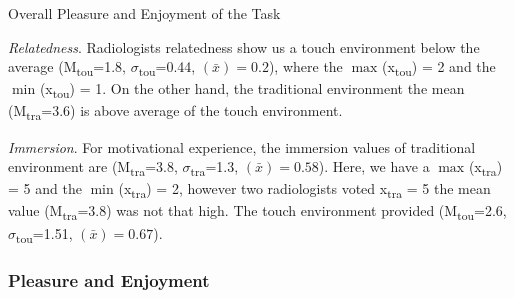 \documentclass{chi-ext}
\begin{document}
\begin{table}
\caption{Overall Pleasure and Enjoyment of the Task}
\label{fig:Fig11}
\end{table}

\columnbreak

\vfill\null

\textit{Relatedness}. Radiologists relatedness show us a touch environment below the average (M\textsubscript{tou}=1.8, $\sigma$\textsubscript{tou}=0.44, {}$\left({\bar x}\right)=0.2$), where the $\max_{}$(x\textsubscript{tou}) = 2 and the $\min_{}$(x\textsubscript{tou}) = 1.  On the other hand, the traditional environment the mean (M\textsubscript{tra}=3.6) is above average of the touch environment.

\textit{Immersion}. For motivational experience, the immersion values of traditional environment are (M\textsubscript{tra}=3.8, $\sigma$\textsubscript{tra}=1.3, {}$\left({\bar x}\right)=0.58$). Here, we have a $\max_{}$(x\textsubscript{tra}) = 5 and the $\min_{}$(x\textsubscript{tra}) = 2, however two radiologists voted x\textsubscript{tra} = 5 the mean value (M\textsubscript{tra}=3.8) was not that high. The touch environment provided (M\textsubscript{tou}=2.6, $\sigma$\textsubscript{tou}=1.51, {}$\left({\bar x}\right)=0.67$).

\subsubsection{Pleasure and Enjoyment}
\end{document}
